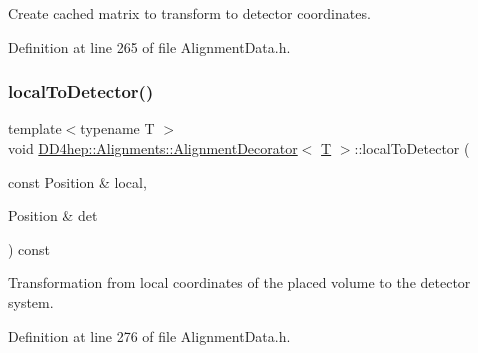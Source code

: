 Create cached matrix to transform to detector coordinates. 



Definition at line 265 of file Alignment\+Data.\+h.

\hypertarget{class_d_d4hep_1_1_alignments_1_1_alignment_decorator_ad4152c1e6ebc6fdfc45fd4d86ea0985b}{}\label{class_d_d4hep_1_1_alignments_1_1_alignment_decorator_ad4152c1e6ebc6fdfc45fd4d86ea0985b} 
\subsubsection{\texorpdfstring{local\+To\+Detector()}{localToDetector()}\hspace{0.1cm}{\footnotesize\ttfamily [1/2]}}
{\footnotesize\ttfamily template$<$typename T $>$ \\
void \hyperlink{class_d_d4hep_1_1_alignments_1_1_alignment_decorator}{D\+D4hep\+::\+Alignments\+::\+Alignment\+Decorator}$<$ \hyperlink{class_t}{T} $>$\+::local\+To\+Detector (\begin{DoxyParamCaption}\item[{const Position \&}]{local,  }\item[{Position \&}]{det }\end{DoxyParamCaption}) const\hspace{0.3cm}{\ttfamily [inline]}}



Transformation from local coordinates of the placed volume to the detector system. 



Definition at line 276 of file Alignment\+Data.\+h.

\hypertarget{class_d_d4hep_1_1_alignments_1_1_alignment_decorator_a8282dd7cfdbe0b1e07f84710cb029178}{}\label{class_d_d4hep_1_1_alignments_1_1_alignment_decorator_a8282dd7cfdbe0b1e07f84710cb029178} 

